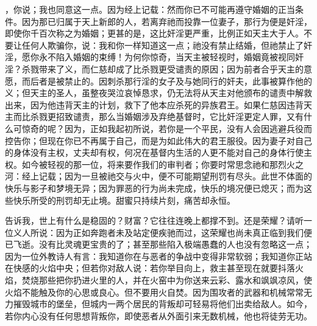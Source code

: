 ，你说；我也同意这一点。因为经上记载：然而你已不可能再遵守婚姻的正当条件。因为那已归属于天上新郎的人，若离弃祂而投靠一位妻子，那行为便是奸淫，即使你千百次称之为婚姻；更甚的是，这比奸淫更严重，比例正如天主大于人。不要让任何人欺骗你，说：我和你一样知道这一点；祂没有禁止结婚，但祂禁止了奸淫，愿你永不陷入婚姻的束缚！为何你惊奇，当天主被轻视时，婚姻竟被视同奸淫？杀戮带来了义，而仁慈却成了比杀戮更受谴责的原因；因为前者合乎天主的意愿，而后者是被禁止的。因刺杀那行淫的女子及与她同行的奸夫，此事被算作他的义；但天主的圣人，虽整夜哭泣哀悼恳求，仍无法将从天主对他颁布的谴责中解救出来，因为他违背天主的计划，救下了他本应杀死的异族君王。如果仁慈因违背天主而比杀戮更招致谴责，那么当婚姻涉及弃绝基督时，它比奸淫更定人罪，又有什么可惊奇的呢？因为，正如我起初所说，若你是一个平民，没有人会因逃避兵役而控告你；但现在你已不再属于自己，而是为如此伟大的君王服役。因为妻子对自己的身体没有主权，丈夫却有权，何况在基督内生活的人更不能对自己的身体行使主权。如今被轻视的那一位，将来要作我们的审判者；你要时常思念祂和那烈火之河：经上记载；因为一旦被祂交与火中，便不可能期望刑罚有尽头。此世不体面的快乐与影子和梦境无异；因为罪恶的行为尚未完成，快乐的境况便已熄灭；而为这些快乐所受的刑罚却无止境。甜蜜只持续片刻，痛苦却永恒。\par

告诉我，世上有什么是稳固的？财富？它往往连晚上都撑不到。还是荣耀？请听一位义人所说：因为正如奔跑者未及站定便疾驰而过，这荣耀也尚未真正临到我们便已飞逝。没有比灵魂更宝贵的了；甚至那些陷入极端愚蠢的人也没有忽略这一点；因为一位外教诗人有言：我知道你在与恶者的争战中变得非常软弱；我知道你正站在快感的火焰中央；但若你对敌人说：若你举目向上，救主甚至现在就要抖落火焰，焚烧那些把你扔进火里的人，并在火窑中为你送来云彩、露水和飒飒凉风，使火焰不能触及你的心思或良心。但不要用火自焚。因为围攻者的武器和机械常常无力摧毁城市的堡垒，但城内一两个居民的背叛却可轻易将他们出卖给敌人。如今，若你内心没有任何思想背叛你，即使恶者从外面引来无数机械，他也将徒劳无功。\par

